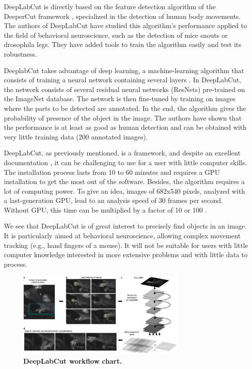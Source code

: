     DeepLabCut is directly based on the feature detection algorithm of the DeeperCut framework \cite{insafutdinov2016deepercut}, specialized in the detection of human body movements. The authors of DeepLabCut have studied this algorithm's performance applied to the field of behavioral neuroscience, such as the detection of mice snouts or drosophila legs. They have added tools to train the algorithm easily and test its robustness.

    DeeplabCut takes advantage of deep learning, a machine-learning algorithm that consists of training a neural network containing several layers \cite{Goodfellow-et-al-2016}. In DeepLabCut, the network consists of several residual neural networks (ResNets) pre-trained on the ImageNet database. The network is then fine-tuned by training on images where the parts to be detected are annotated. In the end, the algorithm gives the probability of presence of the object in the image. The authors have shown that the performance is at least as good as human detection and can be obtained with very little training data (200 annotated images).

    DeepLabCut, as previously mentioned, is a framework, and despite an excellent documentation \cite{nath2019using}, it can be challenging to use for a user with little computer skills. The installation process lasts from 10 to 60 minutes and requires a GPU installation to get the most out of the software. Besides, the algorithm requires a lot of computing power. To give an idea, images of 682x540 pixels, analyzed with a last-generation GPU, lead to an analysis speed of 30 frames per second. Without GPU, this time can be multiplied by a factor of 10 or 100 \cite{mathis2018inference}.

    We see that DeepLabCut is of great interest to precisely find objects in an image. It is particularly aimed at behavioral neuroscience, allowing complex movement tracking (e.g., hand fingers of a mouse). It will not be suitable for users with little computer knowledge interested in more extensive problems and with little data to process.

    \begin{figure}[h]
    \centering
    \includegraphics[width=0.75\textwidth]{part_1/assets/deeplabcut.png}
    \caption{{\bf DeepLabCut workflow chart.}}
    \label{part_1:deeplabcut}
    \end{figure}

